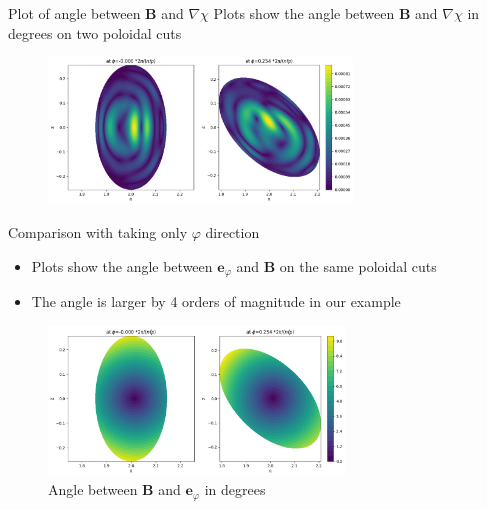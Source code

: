 \documentclass[
	english,%
	logo=false,%
	eurofusion=false, %
	titlegraphic=true, %
	]{ippbeamer}
\begin{document}
\begin{frame}{Plot of angle between $\mathbf{B}$ and $\nabla \chi$}
	Plots show the angle between $\mathbf{B}$ and $\nabla \chi$ in degrees on two poloidal cuts
	\begin{figure}
		\centering
		\includegraphics[width=0.72\textwidth]{plots/Bfield_dommaschk_vs_gvec_2subplots.png}
	\end{figure}

\end{frame}

\begin{frame}{Comparison with taking only $\varphi$ direction}
	\begin{itemize}
		\item Plots show the angle between $\mathbf{e}_\varphi$ and $\mathbf{B}$ on the same 
				poloidal cuts
		\item The angle is larger by 4 orders of magnitude in our example
	\end{itemize}
	\begin{figure}
		\centering
		\includegraphics[width=0.7\textwidth]{plots/B_vs_toroidal_direction.png}
		\caption*{\footnotesize{Angle between $\mathbf{B}$ and 
				  $\mathbf{e}_\varphi$ in degrees}}
	\end{figure}
\end{frame}
\end{document}
